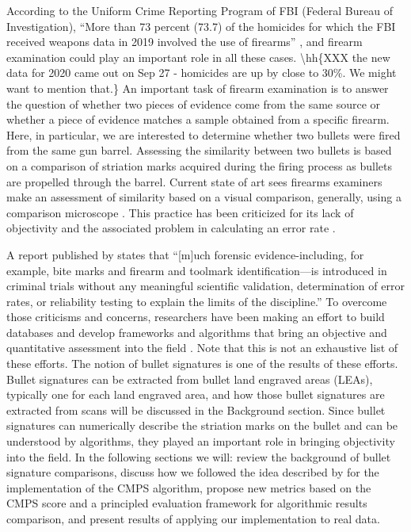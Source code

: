 According to the Uniform Crime Reporting Program of FBI (Federal Bureau
of Investigation), ``More than 73 percent (73.7) of the homicides for
which the FBI received weapons data in 2019 involved the use of
firearms'' \citep{fbiucr}, and firearm examination could play an
important role in all these cases. \textbackslash hh\{XXX the new data
for 2020 came out on Sep 27 - homicides are up by close to 30\%. We
might want to mention that.\} An important task of firearm examination
is to answer the question of whether two pieces of evidence come from
the same source or whether a piece of evidence matches a sample obtained
from a specific firearm. Here, in particular, we are interested to
determine whether two bullets were fired from the same gun barrel.
Assessing the similarity between two bullets is based on a comparison of
striation marks acquired during the firing process as bullets are
propelled through the barrel. Current state of art sees firearms
examiners make an assessment of similarity based on a visual comparison,
generally, using a comparison microscope \citep{afte}. This practice has
been criticized for its lack of objectivity and the associated problem
in calculating an error rate \citep{pcast}.

A report published by \citet{nrc} states that ``{[}m{]}uch forensic
evidence-including, for example, bite marks and firearm and toolmark
identification---is introduced in criminal trials without any meaningful
scientific validation, determination of error rates, or reliability
testing to explain the limits of the discipline.'' To overcome those
criticisms and concerns, researchers have been making an effort to build
databases and develop frameworks and algorithms that bring an objective
and quantitative assessment into the field
\citetext{\citealp[\citet{brundage}, \citet{hamby}, \citet{Hamby:2019},
\citet{song2005}, \citet{ChumbleyL_Scott2010VoTM}, \citet{aoas},
\citet{pmid30444940}]{nistdb}; \citealp{cmps}}. Note that this is not an
exhaustive list of these efforts. The notion of bullet signatures is one
of the results of these efforts. Bullet signatures can be extracted from
bullet land engraved areas (LEAs), typically one for each land engraved
area, and how those bullet signatures are extracted from scans will be
discussed in the Background section. Since bullet signatures can
numerically describe the striation marks on the bullet and can be
understood by algorithms, they played an important role in bringing
objectivity into the field. In the following sections we will: review
the background of bullet signature comparisons, discuss how we followed
the idea described by \citet{cmps} for the implementation of the CMPS
algorithm, propose new metrics based on the CMPS score and a principled
evaluation framework for algorithmic results comparison, and present
results of applying our implementation to real data.

